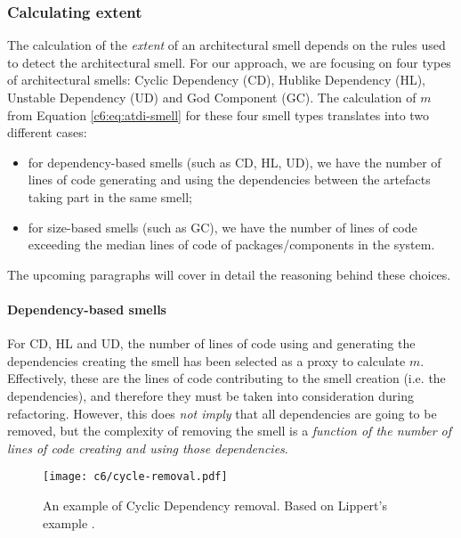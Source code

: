 \subsubsection{Calculating extent}\label{c6:sec:calculating-extent}
The calculation of the \emph{extent} of an architectural smell depends on the rules used to detect the architectural smell.
For our approach, we are focusing on four types of architectural smells: Cyclic Dependency (CD), Hublike Dependency (HL), Unstable Dependency (UD) and God Component (GC).
The calculation of $m$ from Equation \ref{c6:eq:atdi-smell} for these four smell types translates into two different cases:
\begin{itemize}
    \item for dependency-based smells (such as CD, HL, UD), we have the number of lines of code generating and using the dependencies between the artefacts taking part in the same smell;
    \item for size-based smells (such as GC), we have the number of lines of code exceeding the median lines of code of packages/components in the system.
\end{itemize}
The upcoming paragraphs will cover in detail the reasoning behind these choices.

\paragraph{Dependency-based smells}
For CD, HL and UD, the number of lines of code using and generating the dependencies creating the smell has been selected as a proxy to calculate $m$.
Effectively, these are the lines of code contributing to the smell creation (i.e. the dependencies), and therefore they must be taken into consideration during refactoring.
However, this does \emph{not imply} that all dependencies are going to be removed, but the complexity of removing the smell is a \emph{function of the number of lines of code creating and using those dependencies}.

\begin{figure}[]
    \centering
    \texttt{[image: c6/cycle-removal.pdf]}
    \caption{An example of Cyclic Dependency removal. Based on Lippert's example \cite[p. 128]{Lippert2006}.}
    \label{c6:fig:cd-removal}
\end{figure}

